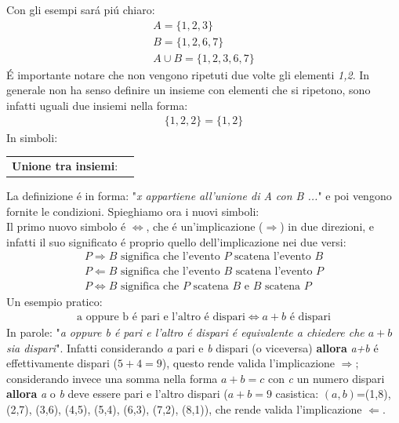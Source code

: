 \documentclass[twoside]{article} %
\begin{document}
	\noindent Con gli esempi sar\'a pi\'u chiaro:
	\begin{gather*}
		A=\{1,2,3\}\\
		B=\{1,2,6,7\}\\
		A\cup B=\{1,2,3,6,7\}
	\end{gather*}
	\'E importante notare che non vengono ripetuti due volte gli elementi \textit{1,2}. In generale non ha senso definire un insieme con elementi che si ripetono, sono infatti uguali due insiemi nella forma:
	\begin{gather*}
		\{1,2,2\}=\{1,2\}
	\end{gather*}
	In simboli:
	\begin{center}		%
		\begin{tabular}{cl}
			\textbf{Unione tra insiemi}:&\makecell[tl]{$x\in A\cup B\Leftrightarrow x\in A \vee x\in B$}
		\end{tabular}
	\end{center}		
	La definizione \'e in forma: "\textit{x appartiene all'unione di A con B ...}" e poi vengono fornite le condizioni. Spieghiamo ora i nuovi simboli:\\
	Il primo nuovo simbolo \'e $\Leftrightarrow$, che \'e un'implicazione ($\Rightarrow$) in due direzioni, e infatti il suo significato \'e proprio quello dell'implicazione nei due versi:
	\begin{gather*}
		P\Rightarrow B \text{ significa che l'evento $P$ scatena l'evento $B$}\\
		P\Leftarrow B \text{ significa che l'evento $B$ scatena l'evento $P$}\\
		P\Leftrightarrow B \text{ significa che $P$ scatena $B$ e $B$ scatena $P$}
	\end{gather*}
	Un esempio pratico:
	\begin{gather*}
		\text{a oppure b \'e pari e l'altro \'e dispari}\Leftrightarrow a+b\text{ \'e dispari}
	\end{gather*}
	In parole: "\textit{a oppure b \'e pari e l'altro \'e dispari \'e equivalente a chiedere che $a+b$ sia dispari}". Infatti considerando \textit{a} pari e \textit{b} dispari (o viceversa) \textbf{allora} \textit{a+b} \'e effettivamente dispari ($5+4=9$), questo rende valida l'implicazione $\Rightarrow$; considerando invece una somma nella forma $a+b=c$ con \textit{c} un numero dispari \textbf{allora} \textit{a} o \textit{b} deve essere pari e l'altro dispari ($a+b=9$ casistica: $(a,b)$=(1,8), (2,7), (3,6), (4,5), (5,4), (6,3), (7,2), (8,1)), che rende valida l'implicazione $\Leftarrow$.
\end{document}

